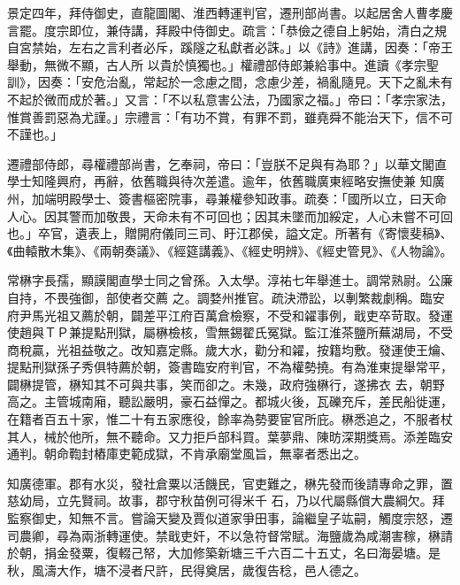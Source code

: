 \begin{pinyinscope}
 景定四年，拜侍御史，直龍圖閣、淮西轉運判官，遷刑部尚書。以起居舍人曹孝慶言罷。度宗即位，兼侍講，拜殿中侍御史。疏言：「恭儉之德自上躬始，清白之規自宮禁始，左右之言利者必斥，蹊隧之私獻者必誅。」以《詩》進講，因奏：「帝王舉動，無微不顯，古人所
 以貴於慎獨也。」權禮部侍郎兼給事中。進讀《孝宗聖訓》，因奏：「安危治亂，常起於一念慮之間，念慮少差，禍亂隨見。天下之亂未有不起於微而成於著。」又言：「不以私意害公法，乃國家之福。」帝曰：「孝宗家法，惟賞善罰惡為尤謹。」宗禮言：「有功不賞，有罪不罰，雖堯舜不能治天下，信不可不謹也。」



 遷禮部侍郎，尋權禮部尚書，乞奉祠，帝曰：「豈朕不足與有為耶？」以華文閣直學士知隆興府，再辭，依舊職與待次差遣。逾年，依舊職廣東經略安撫使兼
 知廣州，加端明殿學士、簽書樞密院事，尋兼權參知政事。疏奏：「國所以立，曰天命人心。因其警而加敬畏，天命未有不可回也；因其未墜而加綏定，人心未嘗不可回也。」卒官，遺表上，贈開府儀同三司、盱江郡侯，謚文定。所著有《寄懷斐稿》、《曲轅散木集》、《兩朝奏議》、《經筵講義》、《經史明辨》、《經史管見》、《人物論》。



 常楙字長孺，顯謨閣直學士同之曾孫。入太學。淳祐七年舉進士。調常熟尉。公廉自持，不畏強御，部使者交薦
 之。調婺州推官。疏決滯訟，以剸繁裁劇稱。臨安府尹馬光祖又薦於朝，闢差平江府百萬倉檢察，不受和糴事例，戢吏卒苛取。發運使趙與ＴＰ兼提點刑獄，屬楙檢核，雪無錫翟氏冤獄。監江淮茶鹽所蕪湖局，不受商稅贏，光祖益敬之。改知嘉定縣。歲大水，勸分和糴，按籍均敷。發運使王爚、提點刑獄孫子秀俱特薦於朝，簽書臨安府判官，不為權勢撓。有為淮東提舉常平，闢楙提管，楙知其不可與共事，笑而卻之。未幾，政府強楙行，遂拂衣
 去，朝野高之。主管城南廂，聽訟嚴明，豪石益憚之。都城火後，瓦礫充斥，差民船徙運，在籍者百五十家，惟二十有五家應役，餘率為勢要宦官所庇。楙悉追之，不服者杖其人，械於他所，無不聽命。又力拒戶部科買。葉夢鼎、陳昉深期獎焉。添差臨安通判。朝命鞫封樁庫吏範成獄，不肯承廟堂風旨，無辜者悉出之。



 知廣德軍。郡有水災，發社倉粟以活饑民，官吏難之，楙先發而後請專命之罪，置慈幼局，立先賢祠。故事，郡守秋苗例可得米千
 石，乃以代屬縣償大農綱欠。拜監察御史，知無不言。嘗論天變及賈似道家爭田事，論繼皇子竑嗣，觸度宗怒，遷司農卿，尋為兩浙轉運使。禁戢吏奸，不以急符督常賦。海鹽歲為咸潮害稼，楙請於朝，捐金發粟，復輟己帑，大加修築新塘三千六百二十五丈，名曰海晏塘。是秋，風濤大作，塘不浸者尺許，民得奠居，歲復告稔，邑人德之。




\end{pinyinscope}
